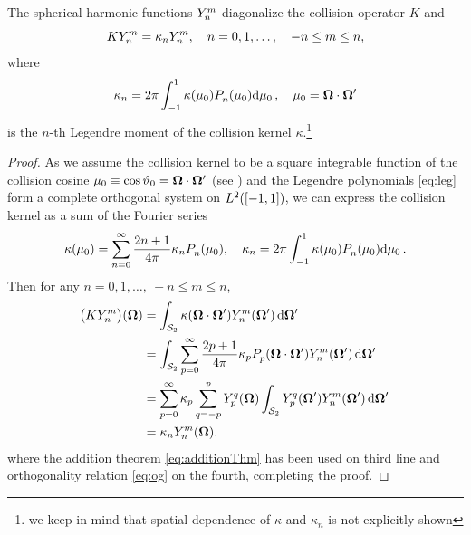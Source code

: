 \begin{lemma}\label{lem:appC}
The spherical harmonic functions $\Y{n}{m}$ diagonalize the collision operator $K$ and
$$
	K\Y{n}{m} = \kappa_n \Y{n}{m},\quad n = 0,1,\ldots,\quad -n \leq m \leq n,
$$
where
$$
	\kappa_n = 2\pi \muint[_0]{\kappa(\mu_0)\P{n}{}(\mu_0)},\quad \mu_0 = \bomega\cdot\bomega'
$$
is the $n$-th Legendre moment of the collision kernel $\kappa$.\footnote{we keep in mind that
spatial dependence of $\kappa$ and $\kappa_n$ is not explicitly shown}
\end{lemma}  
\begin{proof}
	As we assume the collision kernel to be a square integrable function of the collision cosine  
	$\mu_0 \equiv \cos \polar_0 = \bomega\cdot\bomega'$ (see )
	and the Legendre polynomials \eqref{eq:leg} form a complete orthogonal system on $\Lp[2]([-1,1])$, we can express the
	collision kernel as a sum of the Fourier series
	\begin{equation}\label{eq:scattering_exp}
		\kappa(\mu_0) = \suma[n]{0}{\infty}\frac{2n+1}{4\pi}\kappa_n\P{n}{}(\mu_0),\quad
		\kappa_n = 2\pi \muint[_0]{\kappa(\mu_0)\P{n}{}(\mu_0)}.
	\end{equation}
	Then for any $n = 0,1,\ldots,\ -n \leq m \leq n$,
\begin{equation}\label{eq:scattering_PN}
\begin{aligned}
	\bigl(K\Y{n}{m}\bigr)(\bomega) &= \intA[']{\kappa(\bomega\cdot\bomega')\Y{n}{m}(\bomega')} \\
	&= \intA[']{\suma[p]{0}{\infty}\frac{2p+1}{4\pi}\kappa_p\P{p}{}(\bomega\cdot\bomega')\Y{n}{m}(\bomega')} \\
	&= \suma[p]{0}{\infty}\kappa_p\suma[q]{-p}{p}\Y{p}{q}(\bomega)\intA[']{\Y{p}{q}(\bomega')\Y{n}{m}(\bomega')} \\
	&= \kappa_n\Y{n}{m}(\bomega).
\end{aligned}
\end{equation}
	where the addition theorem \eqref{eq:additionThm} has been used on third line and orthogonality relation \eqref{eq:og}
	on the fourth, completing the proof.
\end{proof}

